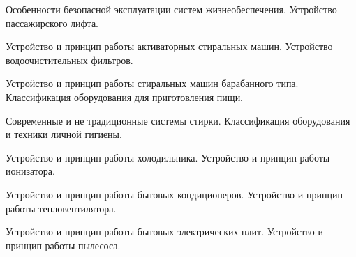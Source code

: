 \documentclass[
	14pt,
	a4paper,
	]
	{scrartcl}
\begin{document}
\vfill

\newpage


\shapk
{}
\setcounter{zad}{0}

\vfill
\z Особенности безопасной эксплуатации систем жизнеобеспечения.
 \vfill
\z Устройство пассажирского лифта.
 \vfill

\vfill

\newpage


\shapk
{}
\setcounter{zad}{0}

\vfill
\z Устройство и принцип работы активаторных стиральных машин.
 \vfill
\z Устройство водоочистительных фильтров.
 \vfill

\vfill

\newpage


\shapk
{}
\setcounter{zad}{0}

\vfill
\z Устройство и принцип работы стиральных машин барабанного типа.
 \vfill
\z Классификация оборудования для приготовления пищи.
 \vfill

\vfill

\newpage


\shapk
{}
\setcounter{zad}{0}

\vfill
\z Современные и не традиционные системы стирки.
 \vfill
\z Классификация оборудования и техники личной гигиены.
 \vfill

\vfill

\newpage


\shapk
{}
\setcounter{zad}{0}

\vfill
\z Устройство и принцип работы холодильника.
 \vfill
\z Устройство и принцип работы ионизатора.
 \vfill

\vfill

\newpage


\shapk
{}
\setcounter{zad}{0}

\vfill
\z Устройство и принцип работы бытовых кондиционеров.
 \vfill
\z Устройство и принцип работы тепловентилятора.
 \vfill

\vfill

\newpage


\shapk
{}
\setcounter{zad}{0}

\vfill
\z Устройство и принцип работы бытовых электрических плит.
 \vfill
\z Устройство и принцип работы пылесоса.
 \vfill

\vfill

\newpage
\end{document}
